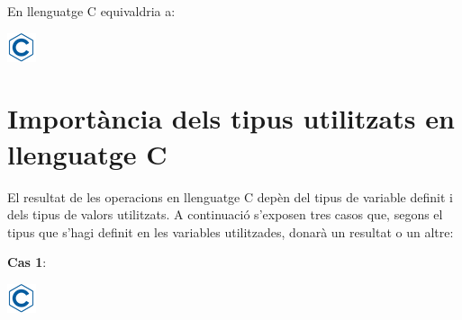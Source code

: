 \documentclass[]{book}
\newenvironment{Shaded}{\begin{snugshade}}{\end{snugshade}}
\newcommand{\DataTypeTok}[1]{\textcolor[rgb]{0.13,0.29,0.53}{#1}}
\newcommand{\DecValTok}[1]{\textcolor[rgb]{0.00,0.00,0.81}{#1}}
\newcommand{\StringTok}[1]{\textcolor[rgb]{0.31,0.60,0.02}{#1}}
\newcommand{\ImportTok}[1]{#1}
\newcommand{\ControlFlowTok}[1]{\textcolor[rgb]{0.13,0.29,0.53}{\textbf{#1}}}
\newcommand{\PreprocessorTok}[1]{\textcolor[rgb]{0.56,0.35,0.01}{\textit{#1}}}
\newcommand{\NormalTok}[1]{#1}
\begin{document}
En llenguatge C equivaldria a:

\includegraphics{./img/c.png}

\begin{Shaded}
\end{Shaded}

\section{Importància dels tipus utilitzats en llenguatge
C}\label{importancia-dels-tipus-utilitzats-en-llenguatge-c}

El resultat de les operacions en llenguatge C depèn del tipus de
variable definit i dels tipus de valors utilitzats. A continuació
s'exposen tres casos que, segons el tipus que s'hagi definit en les
variables utilitzades, donarà un resultat o un altre:

\textbf{Cas 1}:

\includegraphics{./img/c.png}

\begin{Shaded}
\end{Shaded}
\end{document}
